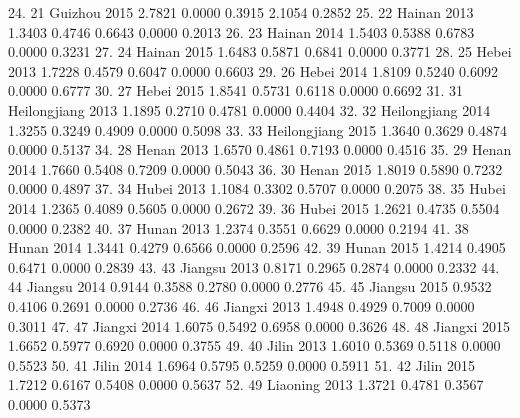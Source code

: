  24. {\VBAR}  21        Guizhou   2015   2.7821   0.0000   0.3915   2.1054   0.2852 {\VBAR}
 25. {\VBAR}  22         Hainan   2013   1.3403   0.4746   0.6643   0.0000   0.2013 {\VBAR}
 26. {\VBAR}  23         Hainan   2014   1.5403   0.5388   0.6783   0.0000   0.3231 {\VBAR}
 27. {\VBAR}  24         Hainan   2015   1.6483   0.5871   0.6841   0.0000   0.3771 {\VBAR}
 28. {\VBAR}  25          Hebei   2013   1.7228   0.4579   0.6047   0.0000   0.6603 {\VBAR}
 29. {\VBAR}  26          Hebei   2014   1.8109   0.5240   0.6092   0.0000   0.6777 {\VBAR}
 30. {\VBAR}  27          Hebei   2015   1.8541   0.5731   0.6118   0.0000   0.6692 {\VBAR}
 31. {\VBAR}  31   Heilongjiang   2013   1.1895   0.2710   0.4781   0.0000   0.4404 {\VBAR}
 32. {\VBAR}  32   Heilongjiang   2014   1.3255   0.3249   0.4909   0.0000   0.5098 {\VBAR}
 33. {\VBAR}  33   Heilongjiang   2015   1.3640   0.3629   0.4874   0.0000   0.5137 {\VBAR}
 34. {\VBAR}  28          Henan   2013   1.6570   0.4861   0.7193   0.0000   0.4516 {\VBAR}
 35. {\VBAR}  29          Henan   2014   1.7660   0.5408   0.7209   0.0000   0.5043 {\VBAR}
 36. {\VBAR}  30          Henan   2015   1.8019   0.5890   0.7232   0.0000   0.4897 {\VBAR}
 37. {\VBAR}  34          Hubei   2013   1.1084   0.3302   0.5707   0.0000   0.2075 {\VBAR}
 38. {\VBAR}  35          Hubei   2014   1.2365   0.4089   0.5605   0.0000   0.2672 {\VBAR}
 39. {\VBAR}  36          Hubei   2015   1.2621   0.4735   0.5504   0.0000   0.2382 {\VBAR}
 40. {\VBAR}  37          Hunan   2013   1.2374   0.3551   0.6629   0.0000   0.2194 {\VBAR}
 41. {\VBAR}  38          Hunan   2014   1.3441   0.4279   0.6566   0.0000   0.2596 {\VBAR}
 42. {\VBAR}  39          Hunan   2015   1.4214   0.4905   0.6471   0.0000   0.2839 {\VBAR}
 43. {\VBAR}  43        Jiangsu   2013   0.8171   0.2965   0.2874   0.0000   0.2332 {\VBAR}
 44. {\VBAR}  44        Jiangsu   2014   0.9144   0.3588   0.2780   0.0000   0.2776 {\VBAR}
 45. {\VBAR}  45        Jiangsu   2015   0.9532   0.4106   0.2691   0.0000   0.2736 {\VBAR}
 46. {\VBAR}  46        Jiangxi   2013   1.4948   0.4929   0.7009   0.0000   0.3011 {\VBAR}
 47. {\VBAR}  47        Jiangxi   2014   1.6075   0.5492   0.6958   0.0000   0.3626 {\VBAR}
 48. {\VBAR}  48        Jiangxi   2015   1.6652   0.5977   0.6920   0.0000   0.3755 {\VBAR}
 49. {\VBAR}  40          Jilin   2013   1.6010   0.5369   0.5118   0.0000   0.5523 {\VBAR}
 50. {\VBAR}  41          Jilin   2014   1.6964   0.5795   0.5259   0.0000   0.5911 {\VBAR}
 51. {\VBAR}  42          Jilin   2015   1.7212   0.6167   0.5408   0.0000   0.5637 {\VBAR}
 52. {\VBAR}  49       Liaoning   2013   1.3721   0.4781   0.3567   0.0000   0.5373 {\VBAR}

